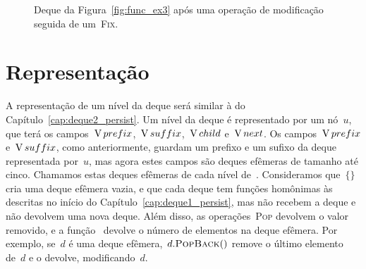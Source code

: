 \documentclass[../../main.tex]{subfiles}
\begin{document}
\begin{figure}[h]
\centering
{}
\caption{Deque da Figura~\ref{fig:func_ex3} após uma operação de modificação seguida de um~\textsc{Fix}.} \label{fig:func_ex3res}
\end{figure}

\section{Representação}

A representação de um nível da deque será similar à do Capítulo~\ref{cap:deque2_persist}. Um nível da deque é representado por um nó~$u$, que terá os campos~$\operatorname{V}{prefix}$,~$\operatorname{V}{suffix}$,~$\operatorname{V}{child}$ e~$\operatorname{V}{next}$.
Os campos~$\operatorname{V}{prefix}$ e~$\operatorname{V}{suffix}$, como anteriormente, guardam um prefixo e um sufixo da deque representada por~$u$, mas agora estes campos são deques efêmeras de tamanho até cinco. Chamamos estas deques efêmeras de cada nível de~. Consideramos que~$\{\}$ cria uma deque efêmera vazia, e que cada deque tem funções homônimas às descritas no início do Capítulo~\ref{cap:deque1_persist}, mas não recebem a deque e não devolvem uma nova deque. Além disso, as operações~\textsc{Pop} devolvem o valor removido, e a função~ devolve o número de elementos na deque efêmera. Por exemplo, se~$d$ é uma deque efêmera,~$d.\mbox{\textsc{PopBack}\ensuremath{()}}$ remove o último elemento de~$d$ e o devolve, modificando~$d$.
\end{document}
